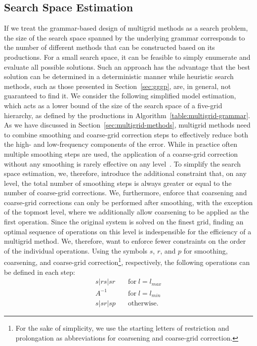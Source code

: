 \subsection{Search Space Estimation}
\label{sec:search-space-estimation}
If we treat the grammar-based design of multigrid methods as a search problem, the size of the search space spanned by the underlying grammar corresponds to the number of different methods that can be constructed based on its productions.
For a small search space, it can be feasible to simply enumerate and evaluate all possible solutions. 
Such an approach has the advantage that the best solution can be determined in a deterministic manner while heuristic search methods, such as those presented in Section~\ref{sec:gggp}, are, in general, not guaranteed to find it.
We consider the following simplified model estimation, which acts as a lower bound of the size of the search space of a five-grid hierarchy, as defined by the productions in Algorithm~\ref{table:multigrid-grammar}. 
As we have discussed in Section~\ref{sec:multigrid-methods}, multigrid methods need to combine smoothing and coarse-grid correction steps to effectively reduce both the high- and low-frequency components of the error.
While in practice often multiple smoothing steps are used, the application of a coarse-grid correction without any smoothing is rarely effective on any level~\cite{trottenberg2000multigrid}.
To simplify the search space estimation, we, therefore, introduce the additional constraint that, on any level, the total number of smoothing steps is always greater or equal to the number of coarse-grid corrections.
We, furthermore, enforce that coarsening and coarse-grid corrections can only be performed after smoothing, with the exception of the topmost level, where we additionally allow coarsening to be applied as the first operation.
Since the original system is solved on the finest grid, finding an optimal sequence of operations on this level is indespensible for the efficiency of a multigrid method.
We, therefore, want to enforce fewer constraints on the order of the individual operations.
Using the symbols $s$, $r$, and $p$ for smoothing, coarsening, and coarse-grid correction\footnote{For the sake of simplicity, we use the starting letters of restriction and prolongation as abbreviations for coarsening and coarse-grid correction.}, respectively, the following operations can be defined in each step:
\begin{equation}\tag{4.8}
\begin{split}
	s | rs | sr & \quad \text{for} \; l = l_{max} \\
	A^{-1} & \quad \text{for} \; l = l_{min} \\
	s | sr | sp & \quad \text{otherwise}.
\end{split}
\end{equation}
